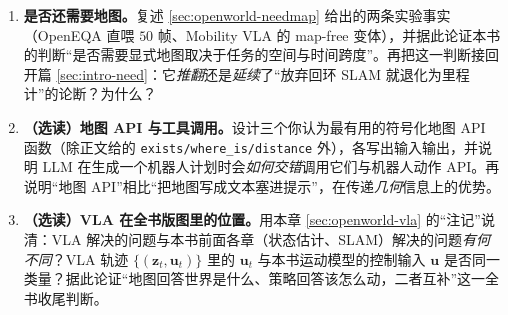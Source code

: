 \begin{enumerate}
  \item \textbf{是否还需要地图。}\;复述 \cref{sec:openworld-needmap} 给出的两条实验事实（OpenEQA 直喂 $50$ 帧、Mobility VLA 的 map-free 变体），并据此论证本书的判断“是否需要显式地图取决于任务的空间与时间跨度”。再把这一判断接回开篇 \cref{sec:intro-need}：它\emph{推翻}还是\emph{延续}了“放弃回环 SLAM 就退化为里程计”的论断？为什么？
  \item \textbf{（选读）地图 API 与工具调用。}\;设计三个你认为最有用的符号化地图 API 函数（除正文给的 \texttt{exists/\allowbreak where\_is/\allowbreak distance} 外），各写出输入输出，并说明 LLM 在生成一个机器人计划时会\emph{如何交错}调用它们与机器人动作 API。再说明“地图 API”相比“把地图写成文本塞进提示”，在传递\emph{几何}信息上的优势。
  \item \textbf{（选读）VLA 在全书版图里的位置。}\;用本章 \cref{sec:openworld-vla} 的“注记”说清：VLA 解决的问题与本书前面各章（状态估计、SLAM）解决的问题\emph{有何不同}？VLA 轨迹 $\{(\mathbf{z}_t,\mathbf{u}_t)\}$ 里的 $\mathbf{u}_t$ 与本书运动模型的控制输入 $\mathbf{u}$ 是否同一类量？据此论证“地图回答世界是什么、策略回答该怎么动，二者互补”这一全书收尾判断。
\end{enumerate}
